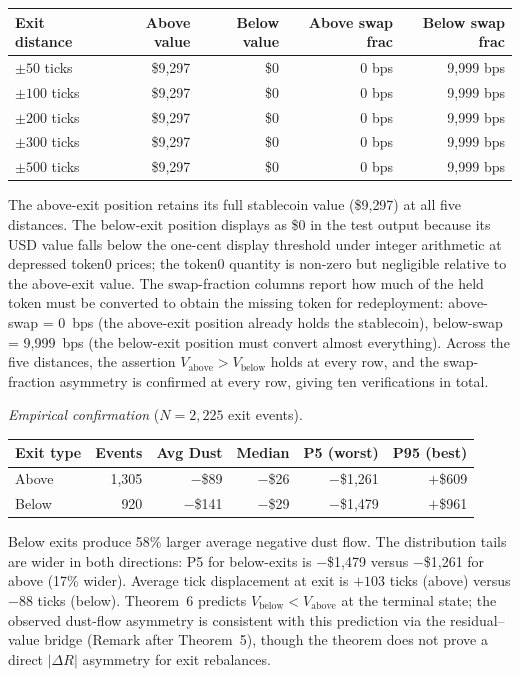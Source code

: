 \documentclass[11pt,a4paper]{article}
\theoremstyle{definition}
\begin{document}
\begin{table}[H]
\centering
\begin{tabular}{@{}lrrrr@{}}
\toprule
Exit distance & Above value & Below value & Above swap frac & Below swap frac \\
\midrule
$\pm 50$ ticks & \$9,297 & \$0 & 0 bps & 9,999 bps \\
$\pm 100$ ticks & \$9,297 & \$0 & 0 bps & 9,999 bps \\
$\pm 200$ ticks & \$9,297 & \$0 & 0 bps & 9,999 bps \\
$\pm 300$ ticks & \$9,297 & \$0 & 0 bps & 9,999 bps \\
$\pm 500$ ticks & \$9,297 & \$0 & 0 bps & 9,999 bps \\
\bottomrule
\end{tabular}
\end{table}

\noindent The above-exit position retains its full stablecoin value (\$9{,}297) at all five distances. The below-exit position displays as \$0 in the test output because its USD value falls below the one-cent display threshold under integer arithmetic at depressed token0 prices; the token0 quantity is non-zero but negligible relative to the above-exit value. The swap-fraction columns report how much of the held token must be converted to obtain the missing token for redeployment: above-swap = 0~bps (the above-exit position already holds the stablecoin), below-swap = 9{,}999~bps (the below-exit position must convert almost everything). Across the five distances, the assertion $V_{\text{above}} > V_{\text{below}}$ holds at every row, and the swap-fraction asymmetry is confirmed at every row, giving ten verifications in total.

\medskip
\noindent\textit{Empirical confirmation} ($N = 2{,}225$ exit events).

\begin{table}[H]
\centering
\begin{tabular}{@{}lrrrrr@{}}
\toprule
Exit type & Events & Avg Dust & Median & P5 (worst) & P95 (best) \\
\midrule
Above & 1,305 & $-$\$89 & $-$\$26 & $-$\$1,261 & $+$\$609 \\
Below & 920 & $-$\$141 & $-$\$29 & $-$\$1,479 & $+$\$961 \\
\bottomrule
\end{tabular}
\end{table}

\noindent Below exits produce 58\% larger average negative dust flow. The distribution tails are wider in both directions: P5 for below-exits is $-$\$1,479 versus $-$\$1,261 for above (17\% wider). Average tick displacement at exit is $+103$ ticks (above) versus $-88$ ticks (below). Theorem~6 predicts $V_{\text{below}} < V_{\text{above}}$ at the terminal state; the observed dust-flow asymmetry is consistent with this prediction via the residual--value bridge (Remark after Theorem~5), though the theorem does not prove a direct $|\Delta R|$ asymmetry for exit rebalances.
\end{document}
